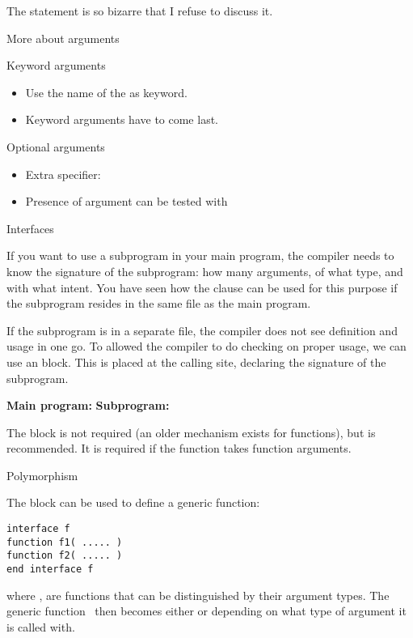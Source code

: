 The  statement is so bizarre that I refuse to discuss it.

 {More about arguments}

\begin{block}{Keyword arguments}
  \label{sl:funcf:keyword}
  \begin{itemize}
  \item Use the name of the  as
    keyword.
  \item Keyword arguments have to come last.
  \end{itemize}
\end{block}

\begin{block}{Optional arguments}
  \label{sl:funcf:optional}
  \begin{itemize}
  \item Extra specifier: 
  \item Presence of argument can be tested with 
  \end{itemize}
\end{block}

 {Interfaces}
\label{sec:finterface}

If you want to use a subprogram in your main program, the compiler
needs to know the signature of the subprogram: how many arguments, of
what type, and with what intent. You have seen how the
 clause can be used for this purpose if the
subprogram resides in the same file as the main program.

If the subprogram is in a separate file, the compiler does not see
definition and usage in one go. To allowed the compiler to do checking
on proper usage, we can use an  block. This
is placed at the calling site, declaring the signature of the
subprogram.

\begin{multicols}{2}
\textbf{Main program:}
\vfill\columnbreak
\textbf{Subprogram:}
\end{multicols}

The  block is not required (an older
 mechanism exists for functions), but is
recommended.
It is required if the function takes function arguments.

 {Polymorphism}

The  block can be used to define a generic
function:
\begin{verbatim}
interface f
function f1( ..... )
function f2( ..... )
end interface f
\end{verbatim}
where , are functions that can be distinguished by their
argument types. The generic function~ then becomes either 
or  depending on what type of argument it is called with.

